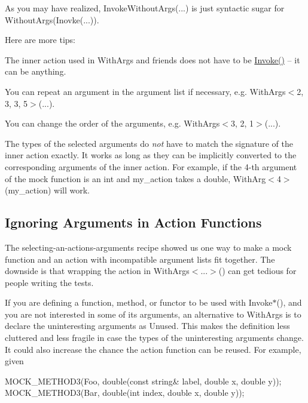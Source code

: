 As you may have realized, {\ttfamily Invoke\+Without\+Args(...)} is just syntactic sugar for {\ttfamily Without\+Args(Inovke(...))}.

Here are more tips\+:


\begin{DoxyItemize}
\item The inner action used in {\ttfamily With\+Args} and friends does not have to be {\ttfamily \hyperlink{namespacetesting_a12aebaf8363d49a383047529f798b694}{Invoke()}} -- it can be anything.
\item You can repeat an argument in the argument list if necessary, e.\+g. {\ttfamily With\+Args$<$2, 3, 3, 5$>$(...)}.
\item You can change the order of the arguments, e.\+g. {\ttfamily With\+Args$<$3, 2, 1$>$(...)}.
\item The types of the selected arguments do {\itshape not} have to match the signature of the inner action exactly. It works as long as they can be implicitly converted to the corresponding arguments of the inner action. For example, if the 4-\/th argument of the mock function is an {\ttfamily int} and {\ttfamily my\+\_\+action} takes a {\ttfamily double}, {\ttfamily With\+Arg$<$4$>$(my\+\_\+action)} will work.
\end{DoxyItemize}

\subsection*{Ignoring Arguments in Action Functions}

The selecting-\/an-\/action\textquotesingle{}s-\/arguments recipe showed us one way to make a mock function and an action with incompatible argument lists fit together. The downside is that wrapping the action in {\ttfamily With\+Args$<$...$>$()} can get tedious for people writing the tests.

If you are defining a function, method, or functor to be used with {\ttfamily Invoke$\ast$()}, and you are not interested in some of its arguments, an alternative to {\ttfamily With\+Args} is to declare the uninteresting arguments as {\ttfamily Unused}. This makes the definition less cluttered and less fragile in case the types of the uninteresting arguments change. It could also increase the chance the action function can be reused. For example, given


\begin{DoxyCode}
MOCK\_METHOD3(Foo, double(const string& label, double x, double y));
MOCK\_METHOD3(Bar, double(int index, double x, double y));
\end{DoxyCode}


